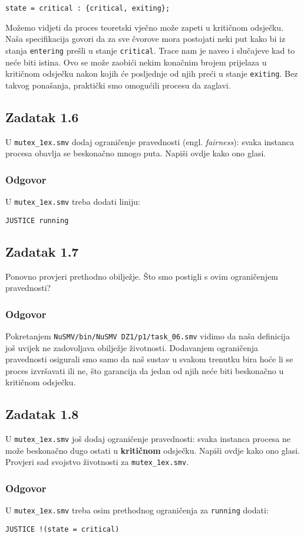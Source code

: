 \documentclass{article}
\newcommand{\zadatak}[1]{\subsection{Zadatak #1}}
\newcommand{\odgovor}{\subsubsection*{Odgovor}}
\newcommand{\code}[1]{\colorbox{blue!11}{\texttt{#1}}}
\begin{document}
\begin{verbatim}
state = critical : {critical, exiting};
\end{verbatim}

\noindent
Možemo vidjeti da proces teoretski vječno može zapeti u kritičnom odsječku. Naša specifikacija govori da za sve čvorove mora postojati neki put kako bi iz stanja \code{entering} prešli u stanje \code{critical}. Trace nam je naveo i slučajeve kad to neće biti istina. Ovo se može zaobići nekim konačnim brojem prijelaza u kritičnom odsječku nakon kojih će posljednje od njih preći u stanje \code{exiting}. Bez takvog ponašanja, praktički smo omogućili procesu da zaglavi.


\zadatak{1.6}

U \code{mutex\_1ex.smv} dodaj ograničenje pravednosti (engl. \textit{fairness}): svaka instanca procesa obavlja se beskonačno mnogo puta. Napiši ovdje kako ono glasi.

\odgovor

U \code{mutex\_1ex.smv} treba dodati liniju:

\begin{verbatim}
JUSTICE running
\end{verbatim}
\pagebreak  %


\zadatak{1.7}

Ponovno provjeri prethodno obilježje. Što smo postigli s ovim ograničenjem pravednosti?

\odgovor

Pokretanjem \code{NuSMV/bin/NuSMV DZ1/p1/task\_06.smv} vidimo da naša definicija još uvijek ne zadovoljava obilježje životnosti. Dodavanjem ograničenja pravednosti osigurali smo samo da naš sustav u svakom trenutku bira hoće li se proces izvršavati ili ne, što garancija da jedan od njih neće biti beskonačno u kritičnom odsječku.



\zadatak{1.8}

U \code{mutex\_1ex.smv} još dodaj ograničenje pravednosti: svaka instanca procesa ne može beskonačno dugo ostati u \textbf{kritičnom} odsječku. Napiši ovdje kako ono glasi. Provjeri sad svojstvo životnosti za \code{mutex\_1ex.smv}.

\odgovor

U \code{mutex\_1ex.smv} treba osim prethodnog ograničenja za \code{running} dodati:

\begin{verbatim}
JUSTICE !(state = critical)
\end{verbatim}
\end{document}
